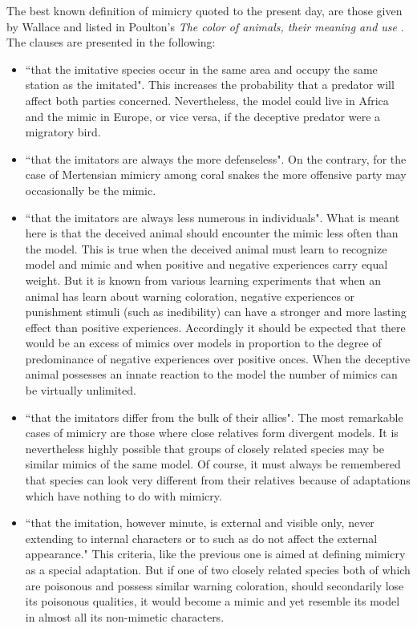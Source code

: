 The best known definition of mimicry quoted to the present day, are those given by Wallace and listed in Poulton's \textit{The color of animals, their meaning and use} \cite{poulton1890colours}. The clauses are presented in the following:

\begin{itemize}
	\item ``that the imitative species occur in the same area and occupy the same station as the imitated". This increases the probability that a predator will affect both parties concerned. Nevertheless, the model could live in Africa and the mimic in Europe, or vice versa, if the deceptive predator were a migratory bird.
	\item ``that the imitators are always the more defenseless". On the contrary, for the case of Mertensian mimicry among coral snakes the more offensive party may occasionally be the mimic.
	\item ``that the imitators are always less numerous in individuals". What is meant here is that the deceived animal should encounter the mimic less often than the model. This is true when the deceived animal must learn to recognize model and mimic and when positive and negative experiences carry equal weight. But it is known from various learning experiments that when an animal has learn about warning coloration, negative experiences or punishment stimuli (such as inedibility) can have a stronger and more lasting effect than positive experiences. Accordingly it should be expected that there would be an excess of mimics over models in proportion to the degree of predominance of negative experiences over positive onces. When the deceptive animal possesses an innate reaction to the model the number of mimics can be virtually unlimited. 
	\item ``that the imitators differ from the bulk of their allies". The most remarkable cases of mimicry are those where close relatives form divergent models. It is nevertheless highly possible that groups of closely related species may be similar mimics of the same model. Of course, it must always be remembered that species can look very different from their relatives because of adaptations which have nothing to do with mimicry. 
	\item ``that the imitation, however minute, is external and visible only, never extending to internal characters or to such as do not affect the external appearance." This criteria, like the previous one is aimed at defining mimicry as a special adaptation. But if one of two closely related species both of which are poisonous and possess similar warning coloration, should secondarily lose its poisonous qualities, it would become a mimic and yet resemble its model in almost all its non-mimetic characters.
\end{itemize}

